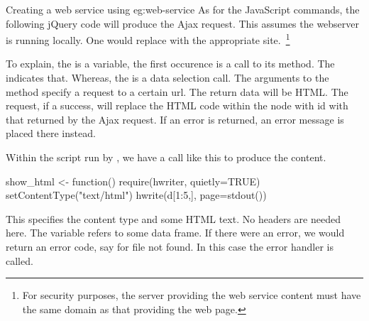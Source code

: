 \begin{example}{Creating a web service using }{eg:web-service}
  As for the JavaScript commands, the following jQuery code will
  produce the Ajax request. This assumes the webserver is running
  locally. One would replace  with the appropriate
  site.~\footnote{For security purposes, the server providing the web
    service content must have the same domain as that providing the
    web page.}
  To explain, the \code{\$} is a  variable, the first
  occurence is a call to its  method. The 
  indicates that. Whereas, the  is a data
  selection call. The arguments to the  method
  specify  a  request to a certain url. The return
  data will be HTML. The request, if a success, will replace the HTML
  code within the node with id  with that returned by
  the Ajax request. If an error is returned, an error message is placed
  there instead.
  
  Within the \R\/ script run by , we have a call like
  this to produce the content.
\begin{Schunk}
\begin{Sinput}
 show_html <- function() {
   require(hwriter, quietly=TRUE)
   setContentType("text/html")
   hwrite(d[1:5,], page=stdout())
 }
\end{Sinput}
\end{Schunk}

This specifies the content type and some HTML text. No headers are
needed here.  The  variable refers to some data frame. If
there were an error, we would return an error code, say 
for file not found. In this case the error handler is called.
  



\end{example}
